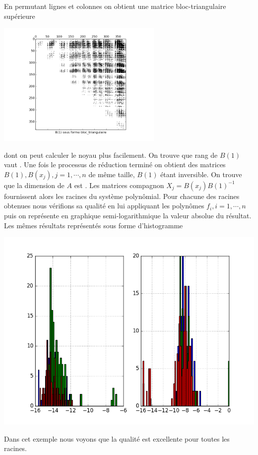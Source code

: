 \documentclass{standalone}
\begin{document}
  En permutant lignes et colonnes on obtient une matrice bloc-triangulaire supérieure
   \begin{center}
  \includegraphics[width=8cm]{../png/beztri.png}
  \end{center}
  dont on peut calculer le noyau plus facilement. On trouve que rang de $B(1)$ vaut .
  Une fois le processus de réduction terminé on obtient des matrices $B(1), B(x_j), j=1,\cdots,n$ de même taille, $B(1)$ étant inversible. On trouve que la dimension de $A$ est . Les matrices compagnon $X_j = B(x_j)B(1)^{-1}$ fournissent alors les racines du système polynômial. Pour chacune des racines obtenues nous vérifions sa qualité en lui appliquant les polynômes $f_i, i=1,\cdots,n$ puis on représente en graphique semi-logarithmique la  valeur absolue du résultat. Les mêmes résultats représentés sous forme d'histogramme
   \begin{center}
  \includegraphics[height=10cm, width=18cm]{../png/ref.png}
  \end{center}

  Dans cet exemple nous voyons que la qualité est excellente pour toutes les racines.
\end{document}
